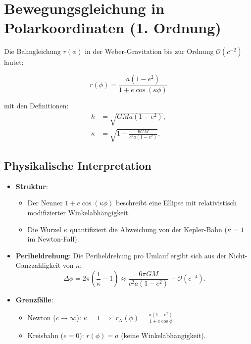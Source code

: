 \newpage
\section{Bewegungsgleichung in Polarkoordinaten (1. Ordnung)}
Die Bahngleichung \(r(\phi)\) in der Weber-Gravitation bis zur Ordnung \(\mathcal{O}(c^{-2})\) lautet:

\begin{equation}
r(\phi) = \frac{a(1 - e^2)}{1 + e \cos\left(\kappa\phi\right)}
\end{equation}

\noindent mit den Definitionen:
\begin{align*}
h &= \sqrt{GMa(1 - e^2)}, \\
\kappa &= \sqrt{1 - \frac{6GM}{c^2a(1 - e^2)}}.
\end{align*}

\subsection*{Physikalische Interpretation}
\begin{itemize}
    \item \textbf{Struktur}: 
        \begin{itemize}
            \item Der Nenner \(1 + e \cos(\kappa\phi)\) beschreibt eine Ellipse mit relativistisch\\modifizierter Winkelabhängigkeit.
            \item Die Wurzel \(\kappa\) quantifiziert die Abweichung von der Kepler-Bahn (\(\kappa = 1\) im Newton-Fall).
        \end{itemize}
    
    \item \textbf{Periheldrehung}:
        Die Periheldrehung pro Umlauf ergibt sich aus der Nicht-Ganzzahligkeit von \(\kappa\):
        \[
        \Delta\phi = 2\pi\left(\frac{1}{\kappa} - 1\right) \approx \frac{6\pi GM}{c^2a(1 - e^2)} + \mathcal{O}(c^{-4}).
        \]
    
    \item \textbf{Grenzfälle}:
        \begin{itemize}
            \item Newton (\(c \to \infty\)): \(\kappa = 1\) \(\Rightarrow\) \(r_N(\phi) = \frac{a(1 - e^2)}{1 + e \cos\phi}\).
            \item Kreisbahn (\(e = 0\)): \(r(\phi) = a\) (keine Winkelabhängigkeit).
        \end{itemize}
\end{itemize}

